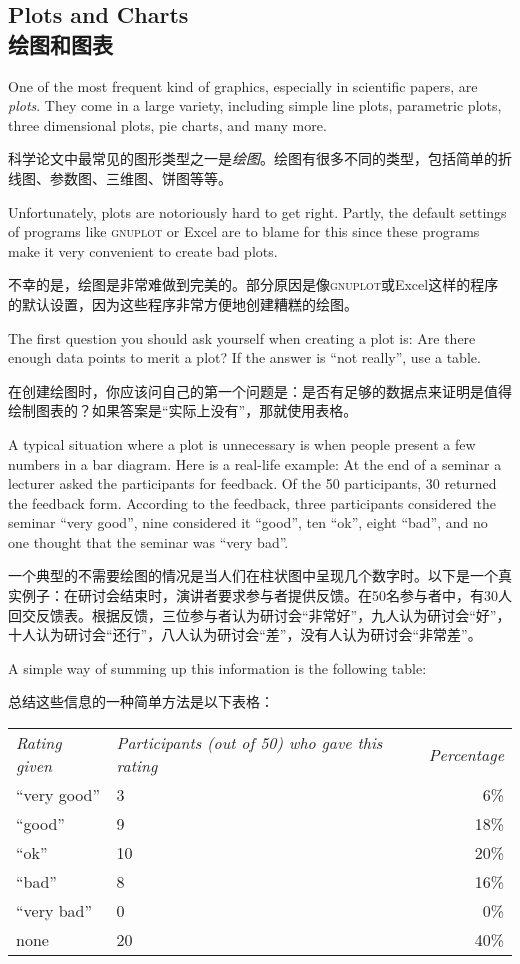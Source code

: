 \subsection{Plots and Charts\\绘图和图表}

One of the most frequent kind of graphics, especially in scientific papers, are
\emph{plots}. They come in a large variety, including simple line plots,
parametric plots, three dimensional plots, pie charts, and many more.

科学论文中最常见的图形类型之一是\emph{绘图}。绘图有很多不同的类型，包括简单的折线图、参数图、三维图、饼图等等。


Unfortunately, plots are notoriously hard to get right. Partly, the default
settings of programs like \textsc{gnuplot} or Excel are to blame for this since
these programs make it very convenient to create bad plots.

不幸的是，绘图是非常难做到完美的。部分原因是像\textsc{gnuplot}或Excel这样的程序的默认设置，因为这些程序非常方便地创建糟糕的绘图。


The first question you should ask yourself when creating a plot is: Are there
enough data points to merit a plot? If the answer is ``not really'', use a
table.

在创建绘图时，你应该问自己的第一个问题是：是否有足够的数据点来证明是值得绘制图表的？如果答案是“实际上没有”，那就使用表格。

A typical situation where a plot is unnecessary is when people present a few
numbers in a bar diagram. Here is a real-life example: At the end of a seminar
a lecturer asked the participants for feedback. Of the 50 participants, 30
returned the feedback form. According to the feedback, three participants
considered the seminar ``very good'', nine considered it ``good'', ten ``ok'',
eight ``bad'', and no one thought that the seminar was ``very bad''.

一个典型的不需要绘图的情况是当人们在柱状图中呈现几个数字时。以下是一个真实例子：在研讨会结束时，演讲者要求参与者提供反馈。在50名参与者中，有30人回交反馈表。根据反馈，三位参与者认为研讨会“非常好”，九人认为研讨会“好”，十人认为研讨会“还行”，八人认为研讨会“差”，没有人认为研讨会“非常差”。

A simple way of summing up this information is the following table:

总结这些信息的一种简单方法是以下表格：

\medskip
\begin{tabular}{lp{3.75cm}r}
  \emph{Rating given} & \raggedright\emph{Participants (out of 50) who gave this rating} &
  \emph{Percentage} \\[1.75em]
  ``very good'' & \hfil\hphantom{0}3\hfil & \hphantom{0}6\% \\
  ``good'' & \hfil\hphantom{0}9\hfil & 18\% \\
  ``ok'' & \hfil10\hfil & 20\% \\
  ``bad'' & \hfil\hphantom{0}8\hfil & 16\% \\
  ``very bad'' & \hfil\hphantom{0}0\hfil & \hphantom{0}0\% \\[2mm]
  none & \hfil20\hfil & 40\% \\
\end{tabular}

